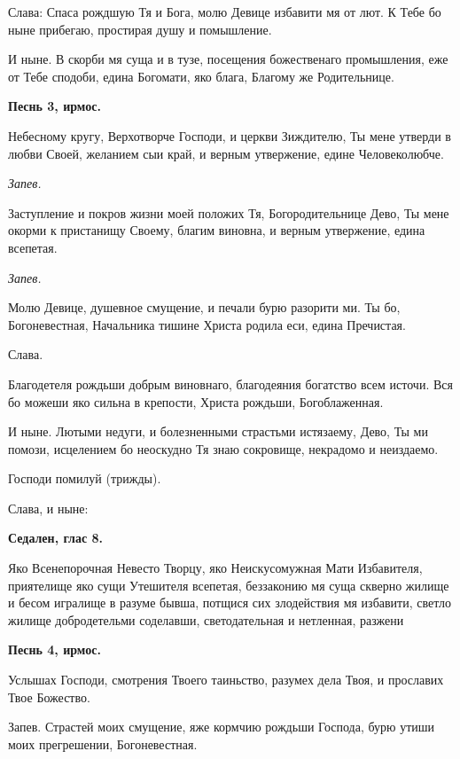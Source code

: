 Слава: Спаса рождшую Тя и Бога, молю Девице избавити мя от лют. К Тебе бо ныне прибегаю, простирая душу и помышление.

И ныне. В скорби мя суща и в тузе, посещения божественаго промышления, еже от Тебе сподоби, едина Богомати, яко блага, Благому же Родительнице.


\medskip


\bfseries Песнь 3, ирмос.\normalfont{}


Небесному кругу, Верхотворче Господи, и церкви Зиждителю, Ты мене утверди в любви Своей, желанием сыи край, и верным утвержение,  едине Человеколюбче.


\itshape Запев.\normalfont{}


Заступление и покров жизни моей положих Тя, Богородительнице Дево, Ты мене окорми  к пристанищу Своему, благим виновна, и верным утвержение, едина всепетая.


\itshape Запев.\normalfont{}


Молю Девице, душевное смущение, и печали бурю разорити ми. Ты бо, Богоневестная, Начальника тишине Христа родила еси, едина Пречистая.


Слава.


Благодетеля рождьши добрым виновнаго, благодеяния богатство всем источи. Вся бо можеши яко сильна в крепости, Христа рождьши, Богоблаженная.

И ныне. Лютыми недуги, и болезненными страстьми истязаему, Дево, Ты ми помози, исцелением бо неоскудно Тя знаю сокровище, некрадомо и неиздаемо.

Господи помилуй (трижды). 

Слава, и ныне:


\medskip


\bfseries Седален, глас 8.\normalfont{}


Яко Всенепорочная Невесто Творцу, яко Неискусомужная Мати Избавителя, приятелище яко сущи Утешителя всепетая, беззаконию мя суща скверно жилище и бесом игралище в разуме бывша, потщися сих злодействия мя избавити, светло жилище добродетельми соделавши, светодательная и нетленная, разжени


\medskip


\bfseries Песнь 4, ирмос.\normalfont{}


Услышах Господи, смотрения Твоего таиньство, разумех дела Твоя, и прославих Твое Божество.

Запев. Страстей моих смущение, яже кормчию  рождьши Господа, бурю утиши моих прегрешении, Богоневестная.

